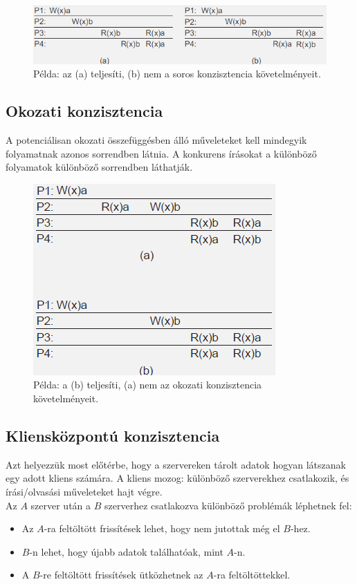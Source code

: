 \documentclass[12pt]{article}
\begin{document}
	\begin{figure}[H]
		\centering
		\includegraphics[width=0.7\linewidth]{img/konz_soros}
		\caption{Példa: az (a) teljesíti, (b) nem a soros konzisztencia követelményeit.}
		\label{fig:konz_soros}
	\end{figure}
	
	\subsection{Okozati konzisztencia}
	
	A potenciálisan okozati összefüggésben álló műveleteket kell mindegyik folyamatnak azonos sorrendben látnia.
	A konkurens írásokat a különböző folyamatok különböző sorrendben láthatják.
	
	\begin{figure}[H]
		\centering
		\includegraphics[width=0.4\linewidth]{img/konz_okozati}
		\caption{Példa: a (b) teljesíti, (a) nem az okozati konzisztencia követelményeit.}
		\label{fig:konz_okozati}
	\end{figure}
	
	\subsection{Kliensközpontú konzisztencia}
	
	Azt helyezzük most előtérbe, hogy a szervereken tárolt adatok hogyan látszanak egy adott kliens számára. A kliens
	mozog: különböző szerverekhez csatlakozik, és írási/olvasási műveleteket hajt végre.\\
	
	\noindent Az $A$ szerver után a $B$ szerverhez csatlakozva különböző problémák léphetnek fel:
	
	\begin{itemize}
		\item	Az $A$-ra feltöltött frissítések lehet, hogy nem jutottak még el $B$-hez.
		\item	$B$-n lehet, hogy újabb adatok találhatóak, mint $A$-n.
		\item	A $B$-re feltöltött frissítések ütközhetnek az $A$-ra feltöltöttekkel.
	\end{itemize}
	
\end{document}
